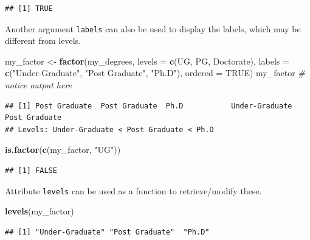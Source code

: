 \documentclass[
]{book}
\newenvironment{Shaded}{\begin{snugshade}}{\end{snugshade}}
\newcommand{\AttributeTok}[1]{\textcolor[rgb]{0.13,0.29,0.53}{#1}}
\newcommand{\CommentTok}[1]{\textcolor[rgb]{0.56,0.35,0.01}{\textit{#1}}}
\newcommand{\ConstantTok}[1]{\textcolor[rgb]{0.56,0.35,0.01}{#1}}
\newcommand{\FunctionTok}[1]{\textcolor[rgb]{0.13,0.29,0.53}{\textbf{#1}}}
\newcommand{\NormalTok}[1]{#1}
\newcommand{\OtherTok}[1]{\textcolor[rgb]{0.56,0.35,0.01}{#1}}
\newcommand{\StringTok}[1]{\textcolor[rgb]{0.31,0.60,0.02}{#1}}
\begin{document}
\begin{verbatim}
## [1] TRUE
\end{verbatim}

Another argument \texttt{labels} can also be used to display the labels, which may be different from levels.

\begin{Shaded}
\begin{Highlighting}[]
\NormalTok{my\_factor }\OtherTok{\textless{}{-}} \FunctionTok{factor}\NormalTok{(my\_degrees, }\AttributeTok{levels =} \FunctionTok{c}\NormalTok{(}\StringTok{\textquotesingle{}UG\textquotesingle{}}\NormalTok{, }\StringTok{\textquotesingle{}PG\textquotesingle{}}\NormalTok{, }\StringTok{\textquotesingle{}Doctorate\textquotesingle{}}\NormalTok{), }
                    \AttributeTok{labels =} \FunctionTok{c}\NormalTok{(}\StringTok{"Under{-}Graduate"}\NormalTok{, }\StringTok{"Post Graduate"}\NormalTok{, }\StringTok{"Ph.D"}\NormalTok{),}
                    \AttributeTok{ordered =} \ConstantTok{TRUE}\NormalTok{)}
\NormalTok{my\_factor }\CommentTok{\# notice output here}
\end{Highlighting}
\end{Shaded}

\begin{verbatim}
## [1] Post Graduate  Post Graduate  Ph.D           Under-Graduate Post Graduate 
## Levels: Under-Graduate < Post Graduate < Ph.D
\end{verbatim}

\begin{Shaded}
\begin{Highlighting}[]
\FunctionTok{is.factor}\NormalTok{(}\FunctionTok{c}\NormalTok{(my\_factor, }\StringTok{"UG"}\NormalTok{))}
\end{Highlighting}
\end{Shaded}

\begin{verbatim}
## [1] FALSE
\end{verbatim}

Attribute \texttt{levels} can be used as a function to retrieve/modify these.

\begin{Shaded}
\begin{Highlighting}[]
\FunctionTok{levels}\NormalTok{(my\_factor)}
\end{Highlighting}
\end{Shaded}

\begin{verbatim}
## [1] "Under-Graduate" "Post Graduate"  "Ph.D"
\end{verbatim}
\end{document}
